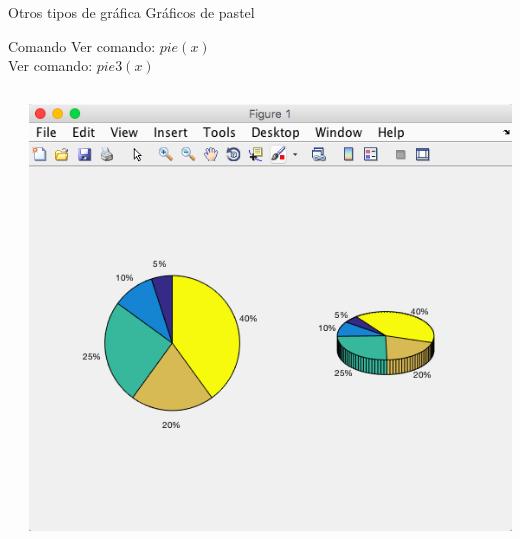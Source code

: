 \documentclass{bredelebeamer}
\begin{document}
\begin{frame}{Otros tipos de gráfica}
Gráficos de pastel
\begin{exampleblock}{Comando}
Ver comando: \textbf{$pie(x)$}\\
Ver comando: \textbf{$pie3(x)$}\\
\end{exampleblock}
\begin{columns}
\begin{column}{0.5\textwidth}

\end{column}
\begin{column}{0.5\textwidth}
\begin{center}
\includegraphics[scale=0.2]{images/pantalla25.png}
\end{center}
\end{column}
\end{columns}
\end{frame}
\end{document}
